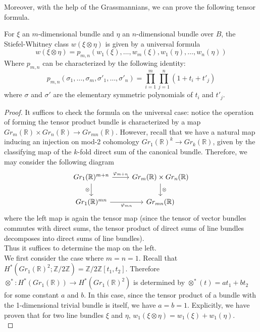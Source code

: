 	Moreover, with the help of the Grassmannians, we can prove the following tensor formula. 
	\begin{thm}\label{SW_tensor}
		For $\xi$ an $m$-dimensional bundle and $\eta$ an $n$-dimensional bundle over $B$, the Stiefel-Whitney class $w(\xi\otimes\eta)$ is given by a universal formula
		\[ w(\xi\otimes\eta)=p_{m,n}(w_1(\xi),\dots,w_m(\xi),w_1(\eta),\dots,w_n(\eta)) \]
		Where $p_{m,n}$ can be characterized by the following identity: 
		\[ p_{m,n}(\sigma_1,\dots,\sigma_m,\sigma'_1,\dots,\sigma'_n)=\prod_{i=1}^m\prod_{j=1}^n(1+t_i+t'_j) \]
		where $\sigma$ and $\sigma'$ are the elementary symmetric polynomials of $t_i$ and $t'_j$. 
	\end{thm}
	\begin{proof}
		It suffices to check the formula on the universal case: notice the operation of forming the tensor product bundle is characterized by a map $Gr_m(\mathbb{R})\times Gr_n(\mathbb{R})\to Gr_{mn}(\mathbb{R})$. However, recall that we have a natural map inducing an injection on mod-2 cohomology $Gr_1(\mathbb{R})^k\to Gr_k(\mathbb{R})$, given by the classifying map of the $k$-fold direct sum of the canonical bundle. Therefore, we may consider the following diagram 
		\[\begin{tikzcd}
			{Gr_1(\mathbb{R})^{m+n}} & {Gr_m(\mathbb{R})\times Gr_n(\mathbb{R})} \\
			{Gr_1(\mathbb{R})^{mn}} & {Gr_{mn}(\mathbb{R})}
			\arrow["\varphi_{m+n}", from=1-1, to=1-2]
			\arrow["\otimes"', from=1-1, to=2-1]
			\arrow["\otimes", from=1-2, to=2-2]
			\arrow["\varphi_{mn}"', from=2-1, to=2-2]
		\end{tikzcd}\]
		where the left map is again the tensor map (since the tensor of vector bundles commutes with direct sums, the tensor product of direct sums of line bundles decomposes into direct sums of line bundles). \\
		Thus it suffices to determine the map on the left. \\
		We first consider the case where $m=n=1$. Recall that $H^*(Gr_1(\mathbb{R})^2;\mathbb{Z}/2\mathbb{Z})=\mathbb{Z}/2\mathbb{Z}[t_1, t_2]$. Therefore $\otimes^*:H^*(Gr_1(\mathbb{R}))\to H^*(Gr_1(\mathbb{R})^2)$ is determined by $\otimes^*(t)=at_1+bt_2$ for some constant $a$ and $b$. In this case, since the tensor product of a bundle with the 1-dimensional trivial bundle is itself, we have $a=b=1$. Explicitly, we have proven that for two line bundles $\xi$ and $\eta$, $w_1(\xi\otimes\eta)=w_1(\xi)+w_1(\eta)$. \\

\end{proof}
